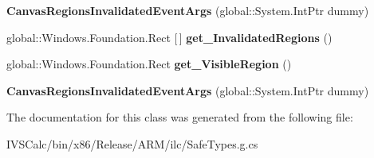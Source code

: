 \begin{DoxyCompactItemize}
{\bfseries Canvas\+Regions\+Invalidated\+Event\+Args} (global\+::\+System.\+Int\+Ptr dummy)
\item 
\mbox{\label{class_microsoft_1_1_graphics_1_1_canvas_1_1_u_i_1_1_xaml_1_1_canvas_regions_invalidated_event_args_a4d1c46ad3f036a38d2fc400ac460c5a2}} 
global\+::\+Windows.\+Foundation.\+Rect \mbox{[}$\,$\mbox{]} {\bfseries get\+\_\+\+Invalidated\+Regions} ()
\item 
\mbox{\label{class_microsoft_1_1_graphics_1_1_canvas_1_1_u_i_1_1_xaml_1_1_canvas_regions_invalidated_event_args_ac1bba7e201dfc21f7d59c3f7646ae44b}} 
global\+::\+Windows.\+Foundation.\+Rect {\bfseries get\+\_\+\+Visible\+Region} ()
\item 
\mbox{\label{class_microsoft_1_1_graphics_1_1_canvas_1_1_u_i_1_1_xaml_1_1_canvas_regions_invalidated_event_args_af22ef2285e76f1d77102ce47d682afc2}} 
{\bfseries Canvas\+Regions\+Invalidated\+Event\+Args} (global\+::\+System.\+Int\+Ptr dummy)
\end{DoxyCompactItemize}


The documentation for this class was generated from the following file\+:\begin{DoxyCompactItemize}
\item 
I\+V\+S\+Calc/bin/x86/\+Release/\+A\+R\+M/ilc/Safe\+Types.\+g.\+cs\end{DoxyCompactItemize}
